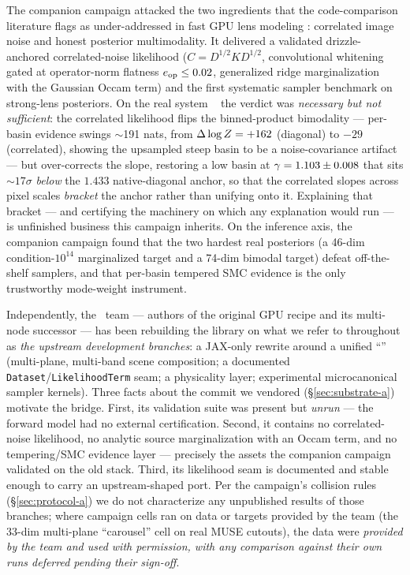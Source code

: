 The companion campaign \citep{cgl2026companion} attacked the two
ingredients that the code-comparison literature flags as under-addressed in
fast GPU lens modeling \citep{etherington2024codecomparison}: correlated
image noise and honest posterior multimodality. It delivered a validated
drizzle-anchored correlated-noise likelihood
($C=D^{1/2}KD^{1/2}$, convolutional whitening gated at operator-norm
flatness $e_{\mathrm{op}}\le0.02$, generalized ridge marginalization with the Gaussian
Occam term) and the first systematic sampler benchmark on strong-lens
posteriors. On the real system \foundry\ \citep{huang2025foundry1} the
verdict was \emph{necessary but not sufficient}: the correlated likelihood
flips the binned-product bimodality --- per-basin evidence swings
$\sim$191 nats, from $\Delta\log Z=+162$ (diagonal) to $-29$ (correlated),
showing the upsampled steep basin to be a noise-covariance artifact --- but
over-corrects the slope, restoring a low basin at
$\gamma=1.103\pm0.008$ that sits $\sim$$17\sigma$ \emph{below} the
$1.433$ native-diagonal anchor, so that the correlated slopes across pixel
scales \emph{bracket} the anchor rather than unifying onto it. Explaining
that bracket --- and certifying the machinery on which any explanation
would run --- is unfinished business this campaign inherits. On the
inference axis, the companion campaign found that the two hardest real
posteriors (a 46-dim condition-$10^{14}$ marginalized target and a 74-dim
bimodal target) defeat off-the-shelf samplers, and that per-basin tempered
SMC evidence is the only trustworthy mode-weight instrument.

Independently, the \gigalens\ team --- authors of the original GPU
recipe \citep{gu2022gigalens} and its multi-node successor
\citep{huang2026gigalens2} --- has been rebuilding the library on what we
refer to throughout as \emph{the upstream development branches}: a
JAX-only rewrite \citep{bradbury2018jax} around a unified ``\sceneapi''
(multi-plane, multi-band scene composition; a documented
\texttt{Dataset}/\texttt{LikelihoodTerm} seam; a physicality layer;
experimental microcanonical sampler kernels). Three facts about the commit
we vendored (\S\ref{sec:substrate-a}) motivate the bridge. First, its
validation suite was present but \emph{unrun} --- the forward model had no
external certification. Second, it contains no correlated-noise
likelihood, no analytic source marginalization with an Occam term, and no
tempering/SMC evidence layer --- precisely the assets the companion
campaign validated on the old stack. Third, its likelihood seam is
documented and stable enough to carry an upstream-shaped port. Per the
campaign's collision rules (\S\ref{sec:protocol-a}) we do not characterize
any unpublished results of those branches; where campaign cells ran on
data or targets provided by the team (the 33-dim multi-plane ``carousel''
cell on real MUSE cutouts), the data were \emph{provided by the team and
used with permission, with any comparison against their own runs deferred
pending their sign-off}.

